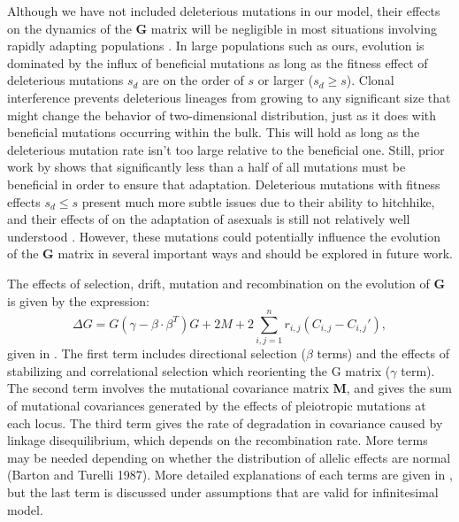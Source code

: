 \documentclass[9pt,twocolumn,twoside]{gsajnl}
\newcommand{\G}{\textbf{G }}
\begin{document}
\label{sec:discussion}
Although we have not included deleterious mutations in our model, their effects on the dynamics of the \G matrix will be negligible in most situations involving rapidly adapting populations \citep{desai2007beneficial,fogle2008clonal,rouzine2008traveling,good2012distribution,yu2010asymptotic}. In large populations such as ours, evolution is dominated by the influx of beneficial mutations as long as the fitness effect of deleterious mutations $s_d$ are on the order of $s$ or larger ($s_d \geq s$). Clonal interference prevents deleterious lineages from growing to any significant size that might change the behavior of two-dimensional distribution, just as it does with beneficial mutations occurring within the bulk. This will hold as long as the deleterious mutation rate isn't too large relative to the beneficial one. Still, prior work by \cite{goyal2012dynamic} shows that significantly less than a half of all mutations must be beneficial in order to ensure that adaptation. Deleterious mutations with fitness effects $s_d \leq s$ present much more subtle issues due to their ability to hitchhike, and their effects of on the adaptation of asexuals is still not relatively well understood \cite{good2014deleterious}. However, these mutations could potentially influence the evolution of the \G matrix in several important ways and should be explored in future work.  
% 
% 

The effects of selection, drift, mutation and recombination on the evolution of \G is given by the expression:
\[\Delta G = G(\gamma - \beta \cdot \beta^T)G + 2 M + 2\sum_{i,j=1}^n r_{i,j}(C_{i,j}-C_{i,j}'),\]
given in \cite[Chapter 20, Box 3]{fox2006evolutionary}. The first term includes directional selection ($\beta$ terms) and the effects of stabilizing and correlational selection which reorienting the G matrix ($\gamma$ term). The second term involves the mutational covariance matrix \textbf{M}, and gives the sum of mutational covariances generated by the effects of pleiotropic mutations at each locus. The third term gives the rate of degradation in covariance caused by linkage disequilibrium, which depends on the recombination rate. More terms may be needed depending on whether the distribution of allelic effects are normal (Barton and Turelli 1987). More detailed explanations of each terms are given in  \cite[Chp34,35,36]{lynch2018evolution}, but the last term is discussed under assumptions that are valid for infinitesimal model.
\end{document}
